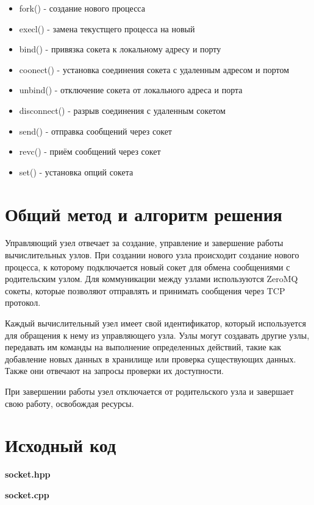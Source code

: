 \documentclass[a4paper, 14pt]{article}
\begin{document}
\begin{itemize}
    \item fork() - создание нового процесса
    \item execl() - замена текустщего процесса на новый
    \item bind() - привязка сокета к локальному адресу и порту
    \item coonect() - установка соединения сокета с удаленным адресом и портом
    \item unbind() - отключение сокета от локального адреса и порта
    \item disconnect() - разрыв соединения с удаленным сокетом
    \item send() - отправка сообщений через сокет
    \item revc() - приём сообщений через сокет
    \item set() - установка опций сокета
\end{itemize}

\section*{Общий метод и алгоритм решения}

Управляющий узел отвечает за создание, управление и завершение работы вычислительных узлов. При создании нового узла происходит создание нового процесса, к которому подключается новый сокет для обмена сообщениями с родительским узлом. Для коммуникации между узлами используются ZeroMQ сокеты, которые позволяют отправлять и принимать сообщения через TCP протокол.

Каждый вычислительный узел имеет свой идентификатор, который используется для обращения к нему из управляющего узла. Узлы могут создавать другие узлы, передавать им команды на выполнение определенных действий, такие как добавление новых данных в хранилище или проверка существующих данных. Также они отвечают на запросы проверки их доступности.

При завершении работы узел отключается от родительского узла и завершает свою работу, освобождая ресурсы.

\section*{Исходный код}

\textbf{socket.hpp}


\textbf{socket.cpp}

\end{document}
